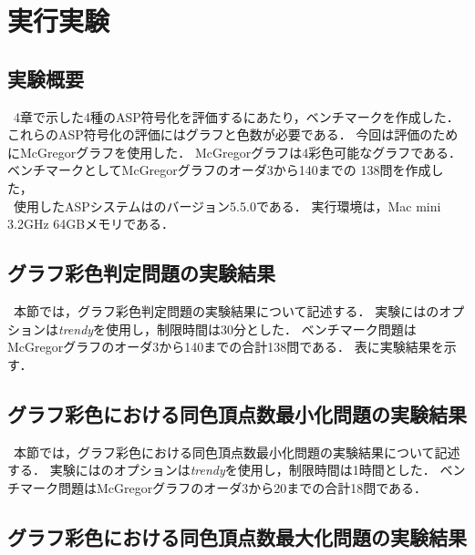 \chapter{実行実験}

\section{実験概要}

\, 4章で示した4種のASP符号化を評価するにあたり，ベンチマークを作成した．
これらのASP符号化の評価にはグラフと色数が必要である．
今回は評価のためにMcGregorグラフを使用した．
McGregorグラフは4彩色可能なグラフである．
ベンチマークとしてMcGregorグラフのオーダ3から140までの
138問を作成した，\\
\, 使用したASPシステムは{\clingo}のバージョン5.5.0である．
実行環境は，Mac mini 3.2GHz 64GBメモリである．

\section{グラフ彩色判定問題の実験結果}

\, 本節では，グラフ彩色判定問題の実験結果について記述する．
実験には{\clingo}のオプションは\textit{trendy}を使用し，制限時間は30分とした．
ベンチマーク問題はMcGregorグラフのオーダ3から140までの合計138問である．
表に実験結果を示す．

\section{グラフ彩色における同色頂点数最小化問題の実験結果}

\, 本節では，グラフ彩色における同色頂点数最小化問題の実験結果について記述する．
実験には{\clingo}のオプションは\textit{trendy}を使用し，制限時間は1時間とした．
ベンチマーク問題はMcGregorグラフのオーダ3から20までの合計18問である．

\section{グラフ彩色における同色頂点数最大化問題の実験結果}

